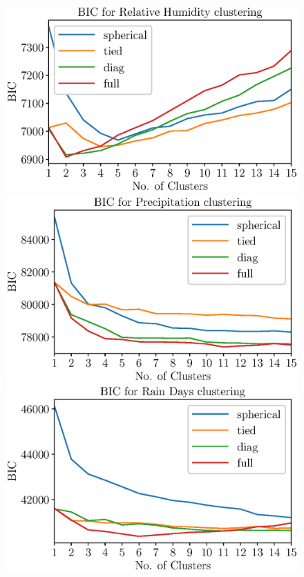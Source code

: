 \documentclass[12pt]{iopart}
\begin{document}
\begin{figure}
\begin{center}
\includegraphics[scale=0.5]{bich.eps}
\includegraphics[scale=0.5]{bicl.eps}\\
\includegraphics[scale=0.5]{bicd.eps}

\end{center}
\end{figure}
\end{document}

